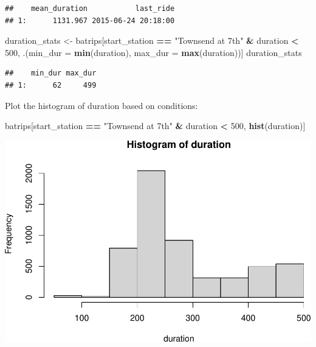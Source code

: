 \documentclass[]{book}
\newenvironment{Shaded}{\begin{snugshade}}{\end{snugshade}}
\newcommand{\DataTypeTok}[1]{\textcolor[rgb]{0.13,0.29,0.53}{#1}}
\newcommand{\DecValTok}[1]{\textcolor[rgb]{0.00,0.00,0.81}{#1}}
\newcommand{\KeywordTok}[1]{\textcolor[rgb]{0.13,0.29,0.53}{\textbf{#1}}}
\newcommand{\NormalTok}[1]{#1}
\newcommand{\OperatorTok}[1]{\textcolor[rgb]{0.81,0.36,0.00}{\textbf{#1}}}
\newcommand{\StringTok}[1]{\textcolor[rgb]{0.31,0.60,0.02}{#1}}
\begin{document}
\begin{Shaded}
\end{Shaded}

\begin{verbatim}
##    mean_duration           last_ride
## 1:      1131.967 2015-06-24 20:18:00
\end{verbatim}

\begin{Shaded}
\begin{Highlighting}[]
\NormalTok{duration_stats <-}\StringTok{ }\NormalTok{batrips[start_station }\OperatorTok{==}\StringTok{ "Townsend at 7th"} \OperatorTok{&}\StringTok{ }\NormalTok{duration }\OperatorTok{<}\StringTok{ }\DecValTok{500}\NormalTok{, }
\NormalTok{                          .(}\DataTypeTok{min_dur =} \KeywordTok{min}\NormalTok{(duration), }
                            \DataTypeTok{max_dur =} \KeywordTok{max}\NormalTok{(duration))]}
\NormalTok{duration_stats}
\end{Highlighting}
\end{Shaded}

\begin{verbatim}
##    min_dur max_dur
## 1:      62     499
\end{verbatim}

Plot the histogram of duration based on conditions:

\begin{Shaded}
\begin{Highlighting}[]
\NormalTok{batrips[start_station }\OperatorTok{==}\StringTok{ "Townsend at 7th"} \OperatorTok{&}\StringTok{ }\NormalTok{duration }\OperatorTok{<}\StringTok{ }\DecValTok{500}\NormalTok{, }\KeywordTok{hist}\NormalTok{(duration)]}
\end{Highlighting}
\end{Shaded}

\includegraphics{code4stem_files/figure-latex/make histogram-1.pdf}
\end{document}
